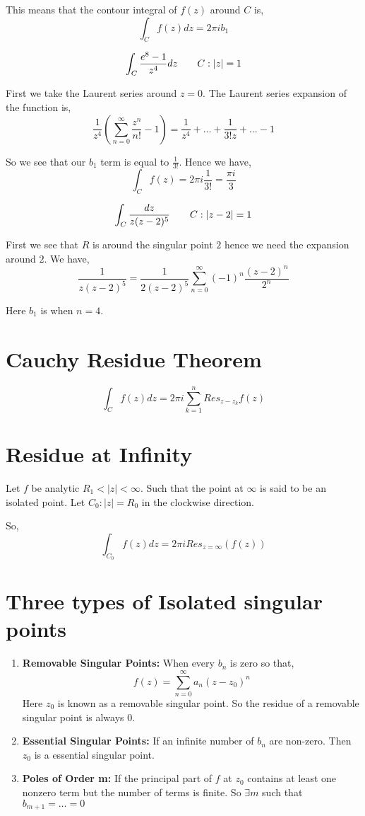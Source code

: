 This means that the contour integral of $f(z)$ around $C$ is, 
$$ \int_C f(z) dz = 2\pi i b_1$$ 

\begin{eg}
   
   $$ \int_C \frac{e^{8}-1}{z^{4}} dz\text{\qquad $C: |z| = 1$} $$ 

   First we take the Laurent series around $z = 0$. The Laurent series expansion of the function is, 
$$ \frac{1}{z^{4}}(\sum_{n=0}^{\infty} \frac{z^{n}}{n!} - 1) = \frac{1}{z^{4}} + \dots + \frac{1}{3! z} + \dots - 1 $$ 

So we see that our $b_1$ term is equal to $\frac{1}{3!}$. Hence we have, 
$$ \int_C f(z) = 2\pi i \frac{1}{3!} =  \frac{\pi i}{3} $$ 
\end{eg}

\begin{eg}
   $$\int_C \frac{dz}{z(z - 2)^{5}} \text{\qquad $C: |z - 2| = 1$}$$

   First we see that $R$ is around the singular point $2$ hence we need the expansion around $2$. We have, 
   $$ \frac{1}{z(z-2)^{5}} = \frac{1}{2(z - 2)^{5}} \sum_{n=0}^{\infty} (-1)^{n} \frac{(z - 2)^{n}}{2^{n}} $$ 

   Here $b_1$ is when $n = 4$.
\end{eg}

\section{Cauchy Residue Theorem}


$$ \int_C f(z) dz = 2 \pi i \sum_{k = 1}^{n} Res_{z - z_k} f(z) $$ 

\section{Residue at Infinity}
Let $f$ be analytic $R_1 < |z| < \infty$. Such that the point at $\infty$ is said to be an isolated point. Let $C_0 : |z| = R_0$ in the clockwise direction.

So, 
$$ \int_{C_0} f(z) dz = 2\pi i Res_{z = \infty}(f(z))$$ 



\section{Three types of Isolated singular points}
\begin{enumerate}
   \item \textbf{Removable Singular Points:} When every $b_n$ is zero so that, 
   $$ f(z) = \sum_{n=0}^{\infty} a_n(z- z_0)^{n} $$ 
   Here $z_0$ is known as a removable singular point. So the residue of a removable singular point is always $0$.
   \item \textbf{Essential Singular Points:} If an infinite number of  $b_n$ are non-zero. Then $z_0$ is a essential singular point.
   \item \textbf{Poles of Order m:} If the principal part of $f$ at $z_0$ contains at least one nonzero term but the number of terms is finite.  So  $\exists m$ such that $b_{m+1} = \dots = 0$
\end{enumerate}


